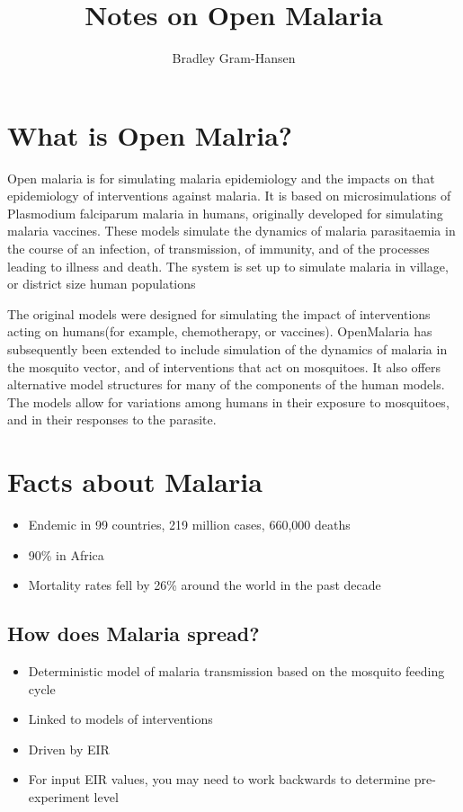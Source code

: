 \documentclass[]{scrartcl}
\title{Notes on Open Malaria}
\author{Bradley Gram-Hansen}
\begin{document}
\maketitle

\begin{abstract}

\end{abstract}

% 

\section{What is Open Malria?}
Open malaria is for simulating malaria epidemiology and the impacts on that epidemiology of interventions against malaria. 
 It is based on microsimulations of Plasmodium falciparum malaria in humans, originally developed for simulating malaria vaccines.
 These models simulate the dynamics of malaria parasitaemia in the course of an infection, of transmission, of immunity, and of the processes leading to illness and death. The system is set up to simulate malaria in village, or district size human populations

The original models were designed for simulating the impact of interventions acting on humans(for example, chemotherapy, or vaccines). OpenMalaria has subsequently been extended to include simulation of the dynamics of malaria in the mosquito vector, and of interventions that act on mosquitoes. It also offers alternative model structures for many of the components of the human models. The models allow for variations among humans in their exposure to mosquitoes, and in their responses to the parasite.

\section{Facts about Malaria}

\begin{itemize}
\item Endemic in 99 countries, 219 million cases, 660,000 deaths 
\item 90\% in Africa
\item Mortality rates fell by 26\% around the world in the past decade
\end{itemize}

\subsection{How does Malaria spread?}
\begin{itemize}
\item Deterministic model of malaria transmission based on the mosquito feeding cycle
\item Linked to models of interventions
\item Driven by EIR
\item For input EIR values, you may need to work backwards to determine pre-experiment level
\end{itemize}
\end{document}
